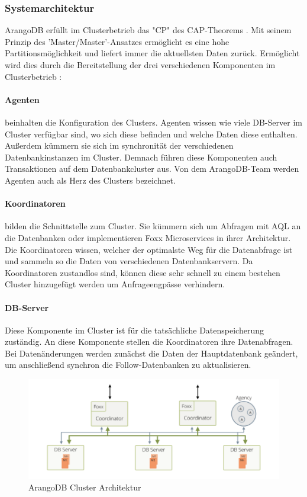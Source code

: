 \subsubsection{Systemarchitektur}
ArangoDB erfüllt im Clusterbetrieb das "CP" des CAP-Theorems \cite{CAP}. Mit seinem Prinzip des 'Master/Master'-Ansatzes ermöglicht es eine hohe Partitionsmöglichkeit und liefert immer die aktuellsten Daten zurück. Ermöglicht wird dies durch die Bereitstellung der drei verschiedenen Komponenten im Clusterbetrieb \cite{ADB_clusterarch}:
\paragraph{Agenten} 
beinhalten die Konfiguration des Clusters. Agenten wissen wie viele DB-Server im Cluster verfügbar sind, wo sich diese befinden und welche Daten diese enthalten. Außerdem kümmern sie sich im synchronität der verschiedenen Datenbankinstanzen im Cluster. Demnach führen diese Komponenten auch Transaktionen auf dem Datenbankcluster aus. Von dem ArangoDB-Team werden Agenten auch als Herz des Clusters bezeichnet. \cite{ADB_clusterarch}
\paragraph{Koordinatoren} bilden die Schnittstelle zum Cluster. Sie kümmern sich um Abfragen mit \ac{AQL} an die Datenbanken oder implementieren Foxx Microservices in ihrer Architektur. Die Koordinatoren wissen, welcher der optimalste Weg für die Datenabfrage ist und sammeln so die Daten von verschiedenen Datenbankservern. Da Koordinatoren zustandlos sind, können diese sehr schnell zu einem bestehen Cluster hinzugefügt werden um Anfrageengpässe verhindern. \cite{ADB_clusterarch}
\paragraph{DB-Server} 
Diese Komponente im Cluster ist für die tatsächliche Datenspeicherung zuständig. An diese Komponente stellen die Koordinatoren ihre Datenabfragen. Bei Datenänderungen werden zunächst die Daten der Hauptdatenbank geändert, um anschließend synchron die Follow-Datenbanken zu aktualisieren.

\begin{figure}[htbp] 
  	\centering
     \includegraphics[width=1\textwidth]{./images/8.cluster-arch.png}
 	\caption{ArangoDB Cluster Architektur \cite{ADB_clusterarch}}
  \label{fig:ClusterArch}
\end{figure}


